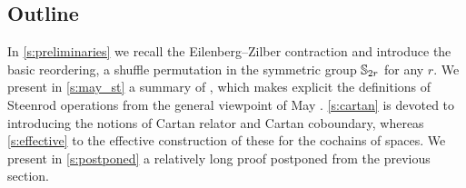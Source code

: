
\subsection*{Outline}

In \cref{s:preliminaries} we recall the Eilenberg--Zilber contraction and introduce the basic reordering, a shuffle permutation in the symmetric group $\mathbb{S}_{2r}$ for any $r$.
We present in \cref{s:may_st} a summary of \cite{medina2021may_st}, which makes explicit the definitions of Steenrod operations \cite{steenrod1953cyclic} from the general viewpoint of May \cite{may1970general}.
\cref{s:cartan} is devoted to introducing the notions of Cartan relator and Cartan coboundary, whereas \cref{s:effective} to the effective construction of these for the cochains of spaces.
We present in \cref{s:postponed} a relatively long proof postponed from the previous section.